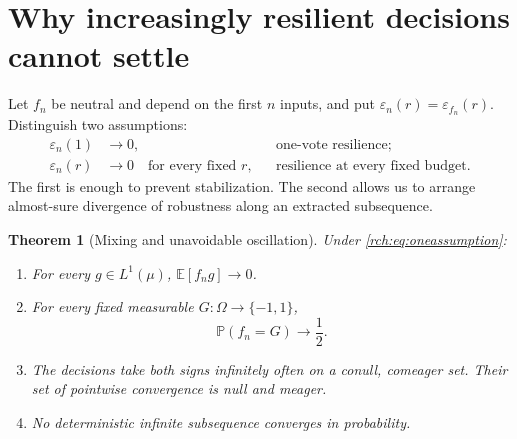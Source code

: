 \documentclass[11pt]{article}
\newtheorem{theorem}{Theorem}[section]
\theoremstyle{definition}
\theoremstyle{remark}
\newcommand{\E}{\mathbb E}
\newcommand{\Prb}{\mathbb P}
\newcommand{\eps}{\varepsilon}
\begin{document}
\section{Why increasingly resilient decisions cannot settle}
\label{rch:sec:oscillation}

Let \(f_n\) be neutral and depend on the first \(n\) inputs, and put
\(\eps_n(r)=\eps_{f_n}(r)\). Distinguish two assumptions:
\begin{align}
 \eps_n(1)&\longrightarrow0,
 &&\text{one-vote resilience;}\label{rch:eq:oneassumption}\\
 \eps_n(r)&\longrightarrow0\quad\text{for every fixed }r,
 &&\text{resilience at every fixed budget.}\label{rch:eq:allassumption}
\end{align}
The first is enough to prevent stabilization. The second allows us to arrange
almost-sure divergence of robustness along an extracted subsequence.

\begin{theorem}[Mixing and unavoidable oscillation]
\label{rch:thm:mixing}
Under \eqref{rch:eq:oneassumption}:
\begin{enumerate}[label=(\roman*)]
\item For every \(g\in L^1(\mu)\), \(\E[f_ng]\to0\).
\item For every fixed measurable \(G:\Omega\to\{-1,1\}\),
\begin{equation}
 \Prb(f_n=G)\longrightarrow\frac12.
 \label{rch:eq:nooracle}
\end{equation}
\item The decisions take both signs infinitely often on a conull, comeager set.
Their set of pointwise convergence is null and meager.
\item No deterministic infinite subsequence converges in probability.
\end{enumerate}
\end{theorem}
\end{document}
